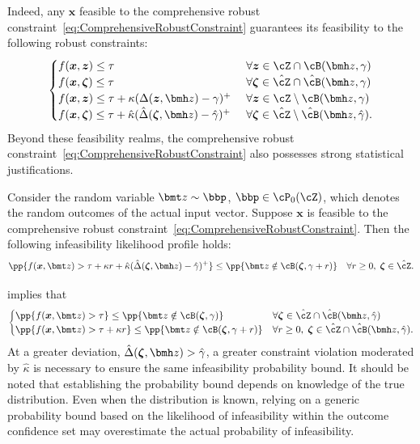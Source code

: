 \documentclass[opre, blindrev]{informs4}
\newcommand{\1}[1]{\mathds{1}{\left(#1\right)}}
\begin{document}
Indeed, any $\bm x$ feasible to the comprehensive robust constraint~\eqref{eq:ComprehensiveRobustConstraint} guarantees its feasibility to the following robust constraints:
$$
\begin{cases}
f(\bm x, \bm z) \leq \tau &~\forall \bm z \in \cZ \cap \cB(\bmh z, \gamma) \\
f(\bm x, \bm \zeta) \leq \tau &~\forall \bm \zeta \in \hat \cZ \cap \hat \cB(\bmh z, \gamma) \\
f(\bm x,\bm z) \leq \tau +  \kappa (\Delta(\bm z,\bmh z) - \gamma)^+ &~\forall \bm z \in \cZ \setminus  \cB(\bmh z, \gamma) \\
f(\bm x,\bm \zeta) \leq \tau +  \hat \kappa (\hat \Delta(\bm \zeta,\bmh z) - \hat \gamma)^+ &~\forall  \bm\zeta \in \hat \cZ \setminus \hat \cB(\bmh z, \hat \gamma). 
\end{cases}
$$
Beyond these feasibility realms, the comprehensive robust constraint~\eqref{eq:ComprehensiveRobustConstraint} also possesses strong statistical justifications.

\begin{theorem}
\label{thm:StatisticalJustification}
Consider the random variable $\bmt z\sim \bbp$, $\bbp \in \cP_0(\cZ)$, which denotes the random outcomes of the actual input vector. Suppose $\bm x$ is feasible to the comprehensive robust constraint~\eqref{eq:ComprehensiveRobustConstraint}. Then the following infeasibility likelihood profile holds:
$$
\pp{f(\bm x,\bmt z) > \tau + \kappa r  + \hat \kappa (\hat \Delta(\bm \zeta,\bmh z) - \hat \gamma)^+ } \leq  \pp{\bmt z \notin \cB(\bm \zeta,\gamma+r)} ~~~\forall r \geq 0, \; \bm \zeta \in \hat \cZ.
$$
\end{theorem}

 implies that 
$$
\begin{cases}
\pp{f(\bm x,\bmt z) > \tau } \leq   \pp{\bmt z \notin \cB(\bm \zeta,\gamma)} & \forall \bm \zeta \in\hat \cZ \cap \hat \cB(\bmh z, \hat \gamma) \\
\pp{f(\bm x,\bmt z) > \tau + \kappa r } \leq  \pp{\bmt z \notin \cB(\bm \zeta,\gamma+r)} & \forall r \geq 0, \; \bm \zeta \in\hat \cZ \cap \hat \cB(\bmh z, \hat \gamma).
\end{cases}
$$
At a greater deviation, $\hat \Delta(\bm \zeta,\bmh z)>\hat \gamma$, a greater constraint violation moderated by $\hat \kappa$ is necessary to ensure the same infeasibility probability bound. It should be noted that establishing the probability bound depends on knowledge of the true distribution. Even when the distribution is known, relying on a generic probability bound based on the likelihood of infeasibility within the outcome confidence set may overestimate the actual probability of infeasibility. 
\end{document}
